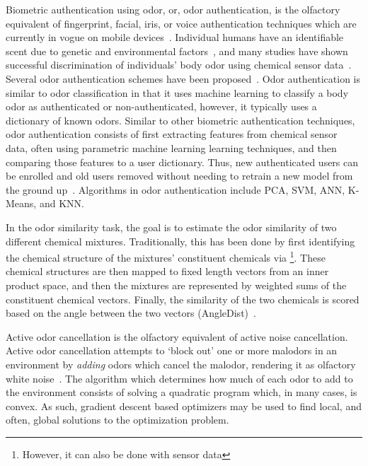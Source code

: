 Biometric authentication using odor, or, odor authentication, is the olfactory
equivalent of fingerprint, facial, iris, or voice authentication techniques
which are currently in vogue on mobile devices~\cite{stokkenes2016biometric}.
Individual humans have an identifiable scent due to genetic and environmental
factors~\cite{penn2007individual}, and many studies have shown successful
discrimination of individuals' body odor using chemical sensor
data~\cite{wongchoosuk2009detection, jha2015quick, jha2016gc}. Several odor
authentication schemes have been proposed~\cite{yang2018human,
shu2014identification}. Odor authentication is similar to odor classification
in that it uses machine learning to classify a body odor as authenticated or
non-authenticated, however, it typically uses a dictionary of known odors.
Similar to other biometric authentication techniques, odor authentication
consists of first extracting features from chemical sensor data, often using
parametric machine learning learning techniques, and then comparing those
features to a user dictionary. Thus, new authenticated users can be enrolled
and old users removed without needing to retrain a new model from the ground
up~\cite{wong2001enhanced}. Algorithms in odor authentication include PCA, SVM,
ANN, K-Means, and KNN.

In the odor similarity task, the goal is to estimate the odor similarity of two
different chemical mixtures.  Traditionally, this has been done by first
identifying the chemical structure of the mixtures' constituent chemicals via
\gcms{}\footnote{However, it can also be done with sensor data}.  These
chemical structures are then mapped to fixed length vectors from an inner
product space, and then the mixtures are represented by weighted sums of the
constituent chemical vectors.  Finally, the similarity of the two chemicals is
scored based on the angle between the two vectors
(AngleDist)~\cite{snitz2013predicting}. %

Active odor cancellation is the olfactory equivalent of active noise
cancellation.  Active odor cancellation attempts to `block out' one or more
malodors in an environment by \textit{adding} odors which cancel the malodor,
rendering it as olfactory white noise~\cite{varshney2014active}.
The algorithm which determines how much of each odor to add to the environment
consists of solving a quadratic program which, in many cases, is convex. As
such, gradient descent based optimizers may be used to find local, and often,
global solutions to the optimization problem.

